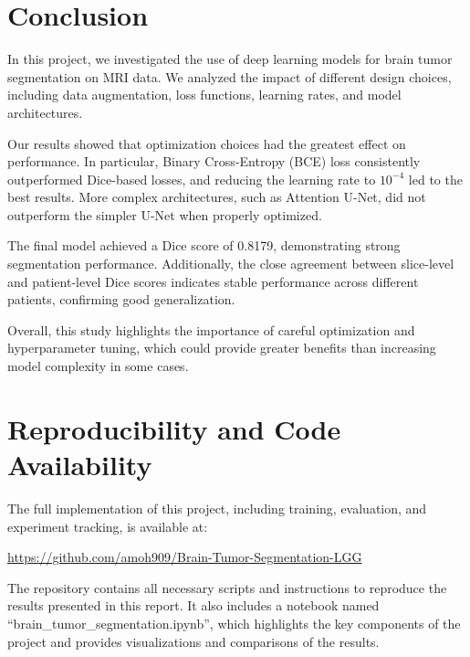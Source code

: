 \documentclass[12pt]{article}
\begin{document}
\section{Conclusion}

In this project, we investigated the use of deep learning models for brain tumor segmentation on MRI data. We analyzed the impact of different design choices, including data augmentation, loss functions, learning rates, and model architectures.

Our results showed that optimization choices had the greatest effect on performance. In particular, Binary Cross-Entropy (BCE) loss consistently outperformed Dice-based losses, and reducing the learning rate to $10^{-4}$ led to the best results. More complex architectures, such as Attention U-Net, did not outperform the simpler U-Net when properly optimized.

The final model achieved a Dice score of 0.8179, demonstrating strong segmentation performance. Additionally, the close agreement between slice-level and patient-level Dice scores indicates stable performance across different patients, confirming good generalization.

Overall, this study highlights the importance of careful optimization and hyperparameter tuning, which could provide greater benefits than increasing model complexity in some cases.

\section{Reproducibility and Code Availability}

The full implementation of this project, including training, evaluation, and experiment tracking, is available at:

\url{https://github.com/amoh909/Brain-Tumor-Segmentation-LGG}

The repository contains all necessary scripts and instructions to reproduce the results presented in this report. It also includes a notebook named ``brain\_tumor\_segmentation.ipynb'', which highlights the key components of the project and provides visualizations and comparisons of the results.
\end{document}
